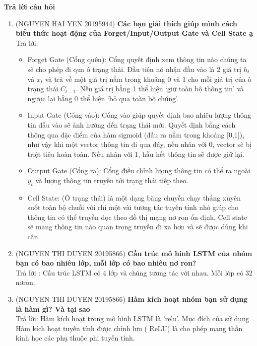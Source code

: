 \documentclass[13pt]{report}
\numberwithin{equation}{section}
\begin{document}
	\fontsize{13pt}{18pt}\selectfont    %
\begin{center}
    \huge{\textbf{Trả lời câu hỏi}}
\end{center}
 
\begin{enumerate}
    \item (NGUYEN HAI YEN 20195944)\textbf{ Các bạn giải thích giúp mình cách biểu thức hoạt động của Forget/Input/Output Gate và Cell State ạ} \\
    Trả lời: 
    \begin{itemize}
        \item Forget Gate (Cổng quên): Cổng quyết định xem thông tin nào chúng ta sẽ cho phép đi qua ô trạng thái. Đầu tiên nó nhận đầu vào là 2 giá trị $h_t$  và $x_t$ và trả về một giá trị nằm trong khoảng 0 và 1 cho mỗi giá trị của ô trạng thái $C_{t-1}$. Nếu giá trị bằng 1 thể hiện ‘giữ toàn bộ thông tin’ và ngược lại bằng 0 thể hiện ‘bỏ qua toàn bộ chúng’.
        \item Input Gate (Cổng vào): Cổng vào giúp quyết định bao nhiêu lượng thông tin đầu vào sẽ ảnh hưởng đến trạng thái mới. Quyết định bằng cách thông qua đặc điểm của hàm sigmoid (đầu ra nằm trong khoảng [0,1]), như vậy khi một vector thông tin đi qua đây, nếu nhân với 0, vector sẽ bị triệt tiêu hoàn toàn. Nếu nhân với 1, hầu hết thông tin sẽ được giữ lại.
        \item Output Gate (Cổng ra): Cổng điều chỉnh lượng thông tin có thể ra ngoài $y_t$ và lượng thông tin truyền tới trạng thái tiếp theo.
        \item Cell State: (Ô trạng thái) là một dạng băng chuyền chạy thẳng xuyên suốt toàn bộ chuỗi với chỉ một vài tương tác tuyến tính nhỏ giúp cho thông tin có thể truyền dọc theo đồ thị mạng nơ ron ổn định. Cell state sẽ mang thông tin nào quan trọng truyền đi xa hơn và sẽ được dùng khi cần.
    \end{itemize}

    \item (NGUYEN THI DUYEN 20195866)\textbf{ Cấu trúc mô hinh LSTM của nhóm bạn có bao nhiêu lớp, mỗi lớp có bao nhiêu nơ ron?}\\
    Trả lời : Cấu trúc LSTM có 4 lớp và chúng tương tác với nhau. Mỗi lớp có 32 nơron.
    
    \item (NGUYEN THI DUYEN 20195866)\textbf{
    Hàm kích hoạt nhóm bạn sử dụng là hàm gì? Và tại sao }\\
    Trả lời: Hàm kích hoạt trong mô hình LSTM là 'relu'. Mục đích của sử dụng Hàm kích hoạt tuyến tính được chỉnh lưu ( ReLU) là cho phép mạng thần kinh học các phụ thuộc phi tuyến tính.
      

\end{enumerate}
\end{document}
